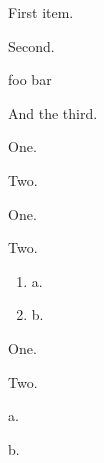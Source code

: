 \documentclass{article}
\begin{document}

\begin{list}{\textbf{\thesection \ - \theexer}}{}
   \item First item.
   \item Second.
   \item[foo] bar
   \item And the third.
\end{list}

\begin{list}{\textbf{\thequestion.}}{}
  \item One.
  \item Two.
\end{list}
  
\begin{list}{\textbf{\thequestion.}}{}
  \item One.
  \item Two.
  \begin{enumerate}
    \item a.
    \item b.
  \end{enumerate}
\end{list}

\begin{list}{\textbf{\thequestion.}}{}
  \item One.
  \item Two.
  \begin{list}{\emph{\thesubquestion.}}{}
    \item a.
    \item b.
  \end{list}
\end{list}
\end{document}
